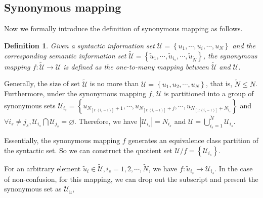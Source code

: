 \documentclass[12pt, draftclsnofoot,onecolumn]{IEEEtran}
\newtheorem{definition}{\bf{Definition}}
\begin{document}
\subsection{Synonymous mapping}
Now we formally introduce the definition of synonymous mapping as follows.
\begin{definition}
Given a syntactic information set $\mathcal{U}=\left\{u_1,\cdots,u_i,\cdots,u_N\right\}$ and the corresponding semantic information set $\tilde {\mathcal{U}}=\left\{\tilde{u}_1,\cdots,\tilde{u}_{i_s},\cdots,\tilde{u}_{\tilde{N}}\right\}$, the synonymous mapping $f:\tilde{\mathcal{U}}\to\mathcal{U}$ is defined as the one-to-many mapping between $\tilde {\mathcal{U}}$ and $\mathcal{U}$.
\end{definition}

Generally, the size of set $\tilde {\mathcal{U}}$ is no more than $\mathcal{U}=\left\{u_1,u_2,\cdots,u_N\right\}$, that is, $\tilde{N}\leq N$. Furthermore, under the synonymous mapping $f$, $\mathcal{U}$ is partitioned into a group of synonymous sets $\mathcal{U}_{i_s}=\left\{u_{N_{[1:(i_s-1)]}+1},\cdots,u_{N_{[1:(i_s-1)]}+j},\cdots,u_{N_{[1:(i_s-1)]}+N_{i_s}}\right\}$ and $\forall i_s\neq j_s,\mathcal{U}_{i_s}\bigcap\mathcal{U}_{j_s}=\varnothing$. Therefore, we have $\left|\mathcal{U}_{i_s}\right|=N_{i_s}$ and $\mathcal{U}=\bigcup_{i_s=1}^{\tilde{N}}\mathcal{U}_{i_s}$.

Essentially, the synonymous mapping $f$ generates an equivalence class partition of the syntactic set. So we can construct the quotient set $\mathcal{U}/f=\left\{\mathcal{U}_{i_s}\right\}$.

For an arbitrary element $\tilde{u}_i\in \tilde{\mathcal{U}},i_s=1,2,\cdots, \tilde{N}$, we have $f:\tilde{u}_{i_s}\to\mathcal{U}_{i_s}$. In the case of non-confusion, for this mapping, we can drop out the subscript and present the synonymous set as $\mathcal{U}_{\tilde{u}}$,
\end{document}
